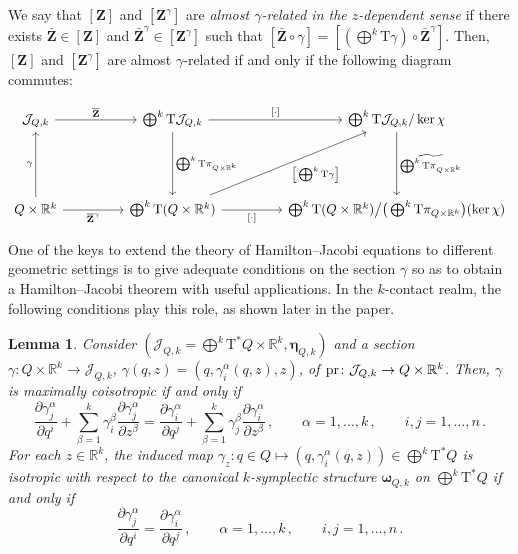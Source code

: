 \documentclass[11pt,twoside]{article}
\theoremstyle{plain}
\newtheorem{lemma}[theorem]{Lemma}
\theoremstyle{definition}
\theoremstyle{remark}
\newcommand{\T}{\mathrm{T}}
\begin{document}
We say that \([\mathbf Z]\) and \([\mathbf Z^\gamma]\) are \emph{almost \(\gamma\)-related in the \(z\)-dependent sense} if there exists $\bar{\bm Z}\in [\mathbf Z]$ and $\bar{\bm Z}^\gamma\in [\mathbf Z^\gamma]$ such that \([\mathbf{\bar{Z}}\circ\gamma]=[(\bigoplus^k \T\gamma)\circ \mathbf{ \bar{Z}}^\gamma]\).  Then, \([\mathbf Z]\) and \([\mathbf Z^\gamma]\) are almost \(\gamma\)-related if and only if the following diagram commutes:

\[
\begin{tikzcd}[row sep=4.8em, column sep=4.6em]
\mathcal{J}_{Q,k} \arrow[r, "{\mathbf{\overline{Z}}}"] 
& \bigoplus^k\T\mathcal{J}_{Q,k} \arrow[r, "{[\cdot]}"] \arrow[d, "{\bigoplus^k\T\pi_{Q\times\mathbb{R}^k}}"] 
& \bigoplus^k \T\mathcal{J}_{Q,k}/\ker\chi \arrow[d, "{\widetilde{\bigoplus^k\T\pi_{Q\times\mathbb{R}^k}}}"] \\
Q\times\mathbb{R}^k \arrow[r, "{\mathbf{\overline{Z}}^\gamma}"'] \arrow[u, "\gamma"] 
& \bigoplus^k \T(Q\times\mathbb{R}^k) \arrow[r, "{[\cdot]}"'] \arrow[ur, "{\big[\bigoplus^k \T\gamma\big]}"'] 
& \bigoplus^k \T(Q\times\mathbb{R}^k)\big/\big(\bigoplus^k\T\pi_{Q\times\mathbb{R}^k}\big)(\ker\chi)
\end{tikzcd}
\]




One of the keys to extend the theory of Hamilton--Jacobi equations to different geometric settings is to give adequate conditions on the section \(\gamma\) so as to obtain a Hamilton--Jacobi theorem with useful applications. In the \(k\)-contact realm, the following conditions play this role, as shown later in the paper.

\begin{lemma}
Consider \((\mathcal{J}_{Q,k}=\bigoplus^{k}\T^{*}Q\times\mathbb{R}^{k}, \bm\eta_{{Q,k}})\) and a section \(\gamma\colon Q\times\mathbb{R}^{k}\to \mathcal{J}_{Q,k}\), \(\gamma(q,z)=(q,\gamma_{i}^{\alpha}(q,z),z)\), of \({\rm pr}\colon\mathcal{J}_{Q,k}\rightarrow Q\times \mathbb{R}^k\). Then, \(\gamma\) is maximally coisotropic if and only if
\begin{equation}\label{eq:Con1}
\frac{\partial \gamma_{j}^{\alpha}}{\partial q^{i}}+\sum_{\beta=1}^k \gamma_{i}^{\beta}\frac{\partial \gamma_{j}^{\alpha}}{\partial z^{\beta}}=\frac{\partial \gamma_{i}^{\alpha}}{\partial q^{j}}+\sum_{\beta=1}^k \gamma_{j}^{\beta}\frac{\partial \gamma_{i}^{\alpha}}{\partial z^{\beta}}\,,\qquad \alpha=1,\dots,k\,,\qquad i,j=1,\dotsc,n\,.
\end{equation}
For each \(z\in\mathbb{R}^{k}\), the induced map \(\gamma_{z}\colon q\in Q\mapsto (q,\gamma^\alpha_i(q,z))\in \bigoplus^{k}\T^{*}Q\) is isotropic with respect to the canonical \(k\)-symplectic structure \(\bm\omega_{Q,k}\) on \(\bigoplus^{k}\T^{*}Q\) if and only if
\begin{equation}\label{eq:Con2}
\frac{\partial \gamma_{j}^{\alpha}}{\partial q^{i}}=\frac{\partial \gamma_{i}^{\alpha}}{\partial q^{j}}\,,\qquad \alpha=1,\dots,k\,,\qquad i,j=1,\dots,n\,.
\end{equation}
\end{lemma}
\end{document}
